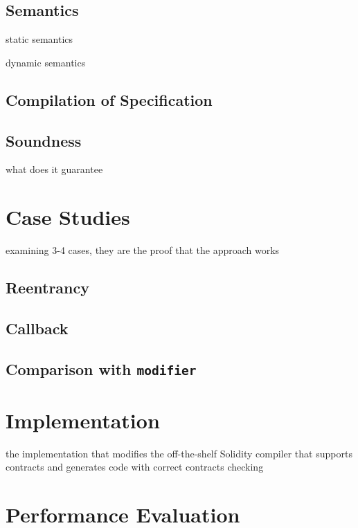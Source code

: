 \documentclass[acmsmall,review,anonymous]{acmart}\settopmatter{printfolios=true,printccs=false,printacmref=false}
\begin{document}


\subsection{Semantics}

static semantics

dynamic semantics

\subsection{Compilation of Specification}

\subsection{Soundness}

what does it guarantee

\section{Case Studies}

examining 3-4 cases, they are the proof that the approach works

\subsection{Reentrancy}

\subsection{Callback}

\subsection{Comparison with \texttt{modifier}}


\section{Implementation}

the implementation that modifies the off-the-shelf Solidity compiler that
supports contracts and generates code with correct contracts checking


\section{Performance Evaluation}
\end{document}
